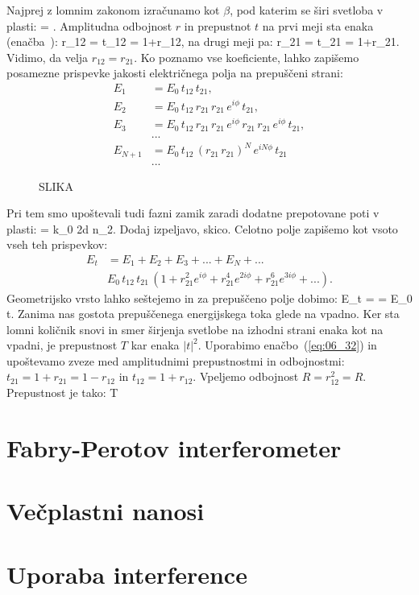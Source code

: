 Najprej z lomnim zakonom izračunamo kot $\beta$, pod katerim se širi svetloba v plasti:
\beq
\sin\beta = \sin\alpha.
\label{eq:06_25}
\eeq
Amplitudna odbojnost $r$ in prepustnot $t$ na prvi meji sta enaka (enačba~):
\beq
r_{12} = \qquad 
{}\qquad t_{12} = 1+r_{12},
\label{eq:06_26}
\eeq
na drugi meji pa:
\beq
r_{21} = \qquad 
{}\qquad t_{21} = 1+r_{21}.
\label{eq:06_27}
\eeq
Vidimo, da velja $r_{12} = r_{21}$. Ko poznamo vse koeficiente, lahko zapišemo
posamezne prispevke jakosti električnega polja na prepuščeni strani:
\begin{align}
E_1 &= E_0\,t_{12}\,t_{21},\\
E_2 &= E_0\,t_{12}\,r_{21}\,r_{21}\,e^{i\phi}\,t_{21},\\
E_3 &= E_0\,t_{12}\,r_{21}\,r_{21}\,e^{i\phi}\,r_{21}\,r_{21}\,e^{i\phi}\,t_{21},\\
&...\\
E_{N+1} &= E_0\,t_{12}\,\left(r_{21}\,r_{21}\right)^N\,e^{iN\phi}\,t_{21}\\
&...
\label{eq:06_29}
\end{align}

\begin{figure}[ht]
\centering
\def\svgwidth{140truemm} 
%
\caption{SLIKA}
\label{fig:06_Nrez}
\end{figure}

Pri tem smo upoštevali tudi fazni zamik zaradi dodatne prepotovane poti v plasti:
\beq
\phi = k_0 2d \cos \beta n_2.
\label{eq:06_31}
\eeq
Dodaj izpeljavo, skico. 
Celotno polje zapišemo kot vsoto vseh teh prispevkov:
\begin{align}
E_t &= E_1+E_2+E_3+... + E_N + ... \\
& E_0\, t_{12}\,t_{21}\,\left(1 + r_{21}^2 e^{i\phi} + r_{21}^4 e^{2i\phi} + r_{21}^6 e^{3i\phi} + ... \right).
\label{eq:06_30}
\end{align}
Geometrijsko vrsto lahko seštejemo in za prepuščeno polje dobimo:
\beq
E_t =  = E_0 t.
\label{eq:06_32}
\eeq
Zanima nas gostota prepuščenega energijskega toka glede na vpadno. Ker sta lomni količnik snovi
in smer širjenja svetlobe na izhodni strani enaka kot na vpadni, je prepustnost $T$ kar enaka $|t|^2$.
Uporabimo enačbo~(\ref{eq:06_32}) in upoštevamo zveze med amplitudnimi prepustnostmi in odbojnostmi:
$t_{21} = 1+r_{21} = 1-r_{12}$ in $t_{12} = 1+r_{12}$. Vpeljemo odbojnost $R = r_{12}^2 = R$.
Prepustnost je tako:
\beq
T
\label{eq:06_33}
\eeq



\section{Fabry-Perotov interferometer}
\section{Večplastni nanosi}
\section{Uporaba interference}

